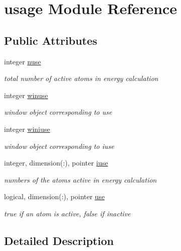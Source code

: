 \hypertarget{classusage}{\section{usage Module Reference}
\label{classusage}
}
\subsection*{Public Attributes}
\begin{DoxyCompactItemize}
\item 
integer \hyperlink{classusage_a18dcb00c2697908dd9b95b1e8eba2572}{nuse}
\begin{DoxyCompactList}\small\item\em total number of active atoms in energy calculation \end{DoxyCompactList}\item 
integer \hyperlink{classusage_a045dd39810620bb5b554845602509721}{winuse}
\begin{DoxyCompactList}\small\item\em window object corresponding to use \end{DoxyCompactList}\item 
integer \hyperlink{classusage_a013f1f4b2ce00f6ff02c870769bf0271}{winiuse}
\begin{DoxyCompactList}\small\item\em window object corresponding to iuse \end{DoxyCompactList}\item 
integer, dimension(\-:), pointer \hyperlink{classusage_a5c6391c4e668a32b98af9eabbdca1929}{iuse}
\begin{DoxyCompactList}\small\item\em numbers of the atoms active in energy calculation \end{DoxyCompactList}\item 
logical, dimension(\-:), pointer \hyperlink{classusage_ab4b5e3df6933910ff79c30d99fafef53}{use}
\begin{DoxyCompactList}\small\item\em true if an atom is active, false if inactive \end{DoxyCompactList}\end{DoxyCompactItemize}


\subsection{Detailed Description}



